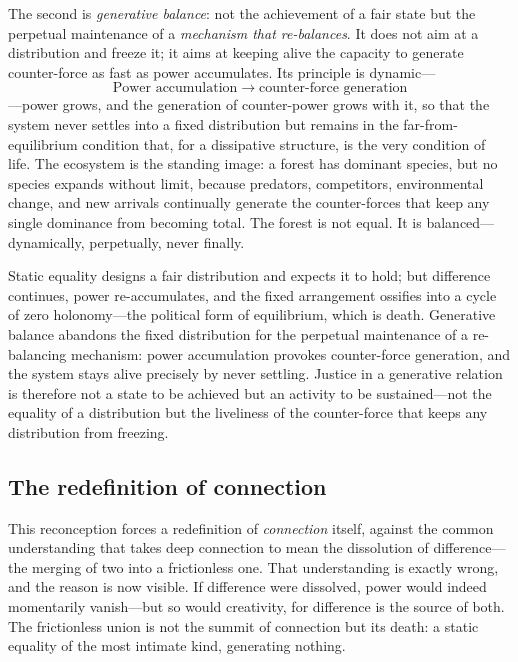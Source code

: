 The second is \emph{generative balance}: not the achievement of a fair state but the perpetual maintenance of a \emph{mechanism that re-balances}. It does not aim at a distribution and freeze it; it aims at keeping alive the capacity to generate counter-force as fast as power accumulates. Its principle is dynamic---
\[
  \text{Power accumulation} \;\longrightarrow\; \text{counter-force generation}
\]
---power grows, and the generation of counter-power grows with it, so that the system never settles into a fixed distribution but remains in the far-from-equilibrium condition that, for a dissipative structure, is the very condition of life. The ecosystem is the standing image: a forest has dominant species, but no species expands without limit, because predators, competitors, environmental change, and new arrivals continually generate the counter-forces that keep any single dominance from becoming total. The forest is not equal. It is balanced---dynamically, perpetually, never finally.

\begin{claim}
Static equality designs a fair distribution and expects it to hold; but difference continues, power re-accumulates, and the fixed arrangement ossifies into a cycle of zero holonomy---the political form of equilibrium, which is death. Generative balance abandons the fixed distribution for the perpetual maintenance of a re-balancing mechanism: power accumulation provokes counter-force generation, and the system stays alive precisely by never settling. Justice in a generative relation is therefore not a state to be achieved but an activity to be sustained---not the equality of a distribution but the liveliness of the counter-force that keeps any distribution from freezing.
\end{claim}

\subsection{The redefinition of connection}
\label{p17:sub:balance-connection}

This reconception forces a redefinition of \emph{connection} itself, against the common understanding that takes deep connection to mean the dissolution of difference---the merging of two into a frictionless one. That understanding is exactly wrong, and the reason is now visible. If difference were dissolved, power would indeed momentarily vanish---but so would creativity, for difference is the source of both. The frictionless union is not the summit of connection but its death: a static equality of the most intimate kind, generating nothing.

